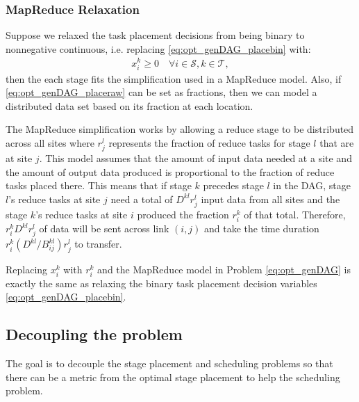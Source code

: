 \subsubsection{MapReduce Relaxation}
Suppose we relaxed the task placement decisions from being binary to nonnegative continuous, i.e. replacing \eqref{eq:opt_genDAG_placebin} with:
\begin{align}
	x_i^k \geq 0 \quad \forall i\in\mathcal{S},k\in\mathcal{T},
\end{align}
then the each stage fits the simplification used in a MapReduce model.
Also, if \eqref{eq:opt_genDAG_placeraw} can be set as fractions, then we can model a distributed data set based on its fraction at each location.

The MapReduce simplification works by allowing a reduce stage to be distributed across all sites where $r^l_j$ represents the fraction of reduce tasks for stage $l$ that are at site $j$.
This model assumes that the amount of input data needed at a site and the amount of output data produced is proportional to the fraction of reduce tasks placed there.
This means that if stage $k$ precedes stage $l$ in the DAG, stage $l$'s reduce tasks at site $j$ need a total of $D^{kl}r_j^l$ input data from all sites and the stage $k$'s reduce tasks at site $i$ produced the fraction $r_i^k$ of that total.
Therefore, $r_i^kD^{kl}r_j^l$ of data will be sent across link $(i,j)$ and take the time duration $r_i^k(D^{kl}/B_{ij}^{kl})r_j^l$ to transfer.

Replacing $x_i^k$ with $r_i^k$ and the MapReduce model in Problem \eqref{eq:opt_genDAG} is exactly the same as relaxing the binary task placement decision variables \eqref{eq:opt_genDAG_placebin}.

\subsection{Decoupling the problem}


The goal is to decouple the stage placement and scheduling problems so that there can be a metric from the optimal stage placement to help the scheduling problem.

